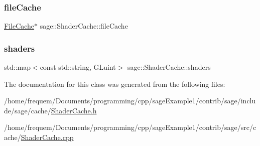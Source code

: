 \subsubsection{\texorpdfstring{fileCache}{fileCache}}
{\footnotesize\ttfamily \mbox{\hyperlink{classsage_1_1FileCache}{File\+Cache}}$\ast$ sage\+::\+Shader\+Cache\+::file\+Cache\hspace{0.3cm}{\ttfamily [private]}}

\mbox{\label{classsage_1_1ShaderCache_a194bb7e1c8d2304d251cdeb52d8530df}} 
\subsubsection{\texorpdfstring{shaders}{shaders}}
{\footnotesize\ttfamily std\+::map$<$const std\+::string, G\+Luint$>$ sage\+::\+Shader\+Cache\+::shaders\hspace{0.3cm}{\ttfamily [private]}}



The documentation for this class was generated from the following files\+:\begin{DoxyCompactItemize}
\item 
/home/frequem/\+Documents/programming/cpp/sage\+Example1/contrib/sage/include/sage/cache/\mbox{\hyperlink{ShaderCache_8h}{Shader\+Cache.\+h}}\item 
/home/frequem/\+Documents/programming/cpp/sage\+Example1/contrib/sage/src/cache/\mbox{\hyperlink{ShaderCache_8cpp}{Shader\+Cache.\+cpp}}\end{DoxyCompactItemize}
